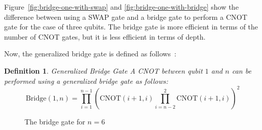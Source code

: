 \documentclass{report}
\newtheorem{definition}{Definition}
\begin{document}
Figure~\ref{fig:bridge-one-with-swap} and \ref{fig:bridge-one-with-bridge} show the difference between using a SWAP gate and a bridge gate to perform a CNOT gate for the case of three qubits. The bridge gate is more efficient in terms of the number of CNOT gates, but it is less efficient in terms of depth.

Now, the generalized bridge gate is defined as follows~\cite{nash2020}:

\begin{definition}{Generalized Bridge Gate}
  A CNOT between qubit $1$ and $n$ can be performed using a generalized bridge gate as follows:
  \begin{equation} \mathrm{Bridge}(1, n) = \prod_{i=1}^{n - 1}(\mathrm{CNOT}(i + 1, i) \prod_{i=n - 2}^{2}\mathrm{CNOT}(i + 1, i))^2
  \end{equation}
\end{definition}


\def\qceq{\midstick[6,brackets=none]{=}}
\begin{figure}[h]
  \centering
{}
  \caption{The bridge gate for $n=6$}
\end{figure}
\end{document}
